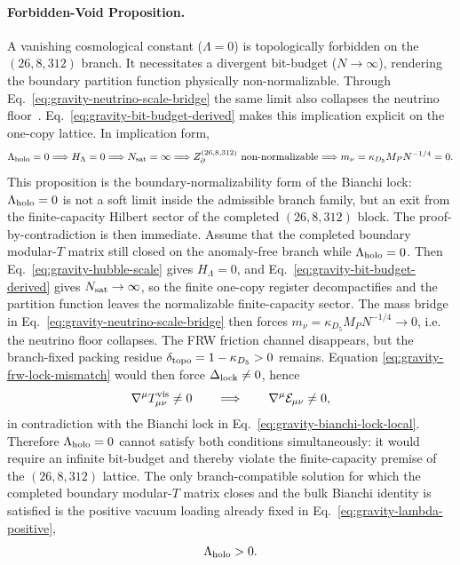 \documentclass[11pt]{article}
\begin{document}
\paragraph{Forbidden-Void Proposition.}
A vanishing cosmological constant ($\Lambda = 0$) is topologically forbidden
on the $(26,8,312)$ branch. It necessitates a divergent bit-budget
($N\to\infty$), rendering the boundary partition function physically
non-normalizable. Through Eq.~\eqref{eq:gravity-neutrino-scale-bridge} the same
limit also collapses the neutrino floor~\cite{friedan1987,witten1989,gko1985}. Eq.~\eqref{eq:gravity-bit-budget-derived} makes this implication
explicit on the one-copy lattice. In implication form,
\begin{equation}
\label{eq:gravity-forbidden-void-chain}
 \Lambda_{\rm holo}=0
 \Longrightarrow
 H_{\Lambda}=0
 \Longrightarrow
 N_{\rm sat}=\infty
 \Longrightarrow
 Z_{\partial}^{(26,8,312)}\ \text{non-normalizable}
 \Longrightarrow
 m_{\nu}=\kappa_{D_5}M_PN^{-1/4}=0.
\end{equation}
This proposition is the boundary-normalizability form of the Bianchi lock:
$\Lambda_{\rm holo}=0$ is not a soft limit inside the admissible branch family,
but an exit from the finite-capacity Hilbert sector of the completed
$(26,8,312)$ block.
The proof-by-contradiction is then immediate. Assume that the completed
boundary modular-$T$ matrix still closed on the anomaly-free branch while
$\Lambda_{\rm holo}=0$. Then Eq.~\eqref{eq:gravity-hubble-scale} gives
$H_{\Lambda}=0$, and Eq.~\eqref{eq:gravity-bit-budget-derived} gives
$N_{\rm sat}\to\infty$, so the finite one-copy register decompactifies and the
partition function leaves the normalizable finite-capacity sector. The mass
bridge in Eq.~\eqref{eq:gravity-neutrino-scale-bridge} then forces
$m_{\nu}=\kappa_{D_5}M_PN^{-1/4}\to0$, i.e. the neutrino floor collapses. The
FRW friction channel disappears, but the branch-fixed packing residue
$\delta_{\rm topo}=1-\kappa_{D_5}>0$ remains. Equation
\eqref{eq:gravity-frw-lock-mismatch} would then force
$\Delta_{\rm lock}\neq0$, hence
\begin{equation}
\label{eq:gravity-bianchi-lock-contradiction}
 \nabla^{\mu}T^{\rm vis}_{\mu\nu}\neq0
 \qquad\Longrightarrow\qquad
 \nabla^{\mu}\mathcal E_{\mu\nu}\neq0,
\end{equation}
in contradiction with the Bianchi lock in
Eq.~\eqref{eq:gravity-bianchi-lock-local}. Therefore $\Lambda_{\rm holo}=0$
cannot satisfy both conditions simultaneously: it would require an infinite
bit-budget and thereby violate the finite-capacity premise of the
$(26,8,312)$ lattice. The only branch-compatible solution for which the
completed boundary modular-$T$ matrix closes and the bulk Bianchi identity is
satisfied is the positive vacuum loading already fixed in
Eq.~\eqref{eq:gravity-lambda-positive},
\begin{equation}
 \Lambda_{\rm holo}>0.
\end{equation}
\end{document}

